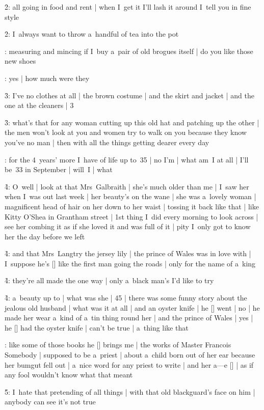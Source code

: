 \f2:
all going in food and rent |
when I~get it I'll lash it around I~tell you in fine style

\f2:
I~always want to throw a~handful of tea into the pot

:
measuring and mincing if I~buy a~pair of old brogues itself |
do you like those new shoes

:
yes |
how much were they

\f3:
I've no clothes at all |
the brown costume |
and the skirt and jacket |
and the one at the cleaners |
3

\f3:
what's that for any woman cutting up this old hat and patching up the other |
the men won't look at you and women try to walk on you because they know you've no man |
then with all the things getting dearer every day

:
for the 4~years' more I~have of life up to~35 |
no I'm |
what am~I at all |
I'll be~33 in September |
will~I |
what

\f4:
O~well |
look at that Mrs~Galbraith |
she's much older than me |
I~saw her when I~was out last week |
her beauty's on the wane |
she was a~lovely woman |
magnificent head of hair on her down to her waist |
tossing it back like that |
like Kitty O'Shea in Grantham street |
1st thing I~did every morning to look across |
see her combing it as if she loved it and was full of it |
pity I~only got to know her the day before we left

\f4:
and that Mrs~Langtry the jersey lily |
the prince of Wales was in love with |
I~suppose he's [\wales] like the first man going the roads |
only for the name of a~king

\f4:
they're all made the one way |
only a~black man's I'd like to try

\f4:
a~beauty up to |
what was she |
45 |
there was some funny story about the jealous old husband |
what was it at all |
and an oyster knife |
he [\mrlangtry] went |
no |
he made her wear a~kind of a~tin thing round her |
and the prince of Wales |
yes |
he [\wales] had the oyster knife |
can't be true |
a~thing like that

:
like some of those books he [\bloom] brings me |
the works of Master Francois Somebody |
supposed to be a~priest |
about a~child born out of her ear because her bumgut fell out |
a~nice word for any priest to write |
and her a---e [\arse] |
as if any fool wouldn't know what that meant

\f5:
I~hate that pretending of all things |
with that old blackguard's face on him |
anybody can see it's not true


